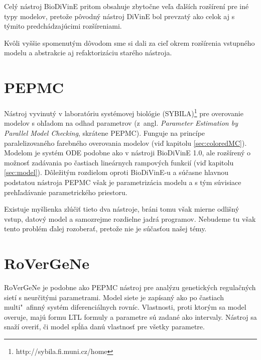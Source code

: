 \documentclass[11pt,final,oneside]{fithesis}
\begin{document}
Cel\'y n\'astroj BioDiVinE pritom obsahuje zbyto\v cne ve\v la \v dal\v s\'ich roz\v s\'iren\'i pre in\'e typy modelov, preto\v ze p\^ ovodn\'y n\'astroj 
DiVinE bol prevzat\'y ako celok aj s t\'ymito predch\'adzaj\'ucimi roz\v s\'ireniami.

Kv\^ oli vy\v s\v sie spomenut\'ym d\^ ovodom sme si dali za cie\v l okrem roz\v s\'irenia vstupn\'eho modelu a abstrakcie aj refaktoriz\'aciu star\'eho n\'astroja.
\cite{BIODIVINE}

\section{PEPMC}
\label{sec:pepmc}
N\'astroj vyvinut\'y v laborat\'oriu syst\'emovej biol\'ogie (SYBILA)\footnote{http://sybila.fi.muni.cz/home} pre overovanie modelov s oh\v ladom na odhad 
parametrov (z~angl. \textit{
Parameter Estimation by Parallel Model Checking}, skr\'atene PEPMC). Funguje na princ\'ipe paralelizovan\'eho farebn\'eho overovania modelov 
(vi\v d kapitolu \ref{sec:coloredMC}). Modelom je syst\'em ODE podobne ako v n\'astroji BioDiVinE 1.0, ale roz\v s\'iren\'y o mo\v znos\v t
zad\'avania po \v castiach line\'arnych rampov\'ych funkci\'i (vi\v d kapitolu \ref{sec:model}). D\^ ole\v zit\'ym rozdielom oproti BioDiVinE-u a s\'u\v casne 
hlavnou podstatou n\'astroja PEPMC v\v sak je parametriz\'acia modelu a s t\'ym s\'uvisiace preh\v lad\'avanie parametrick\'eho priestoru.

Existuje my\v slienka zl\'u\v ci\v t tieto dva n\'astroje, br\'ani tomu v\v sak mierne odli\v sn\'y vstup, datov\'y model a samozrejme rozdielne jadr\'a 
programov. Nebudeme tu v\v sak tento probl\'em \v dalej rozobera\v t, preto\v ze nie je s\'u\v cas\v tou na\v sej t\'emy.
\cite{HIBI-2010}

\section{RoVerGeNe}
RoVerGeNe je podobne ako PEPMC n\'astroj pre anal\'yzu genetick\'ych regula\v cn\'ych siet\'i s neur\v cit\'ymi parametrami. Model siete je zap\'isan\'y ako
po \v castiach multi"~afinn\'y syst\'em diferenci\'alnych rovn\'ic. Vlastnosti, proti ktor\'ym sa model overuje, maj\'u formu LTL formuly a parametre s\'u 
zadan\'e ako intervaly. N\'astroj sa sna\v z\'i overi\v t, \v ci model sp\'l\v na dan\'u vlastnos\v t pre v\v setky parametre.
\end{document}
